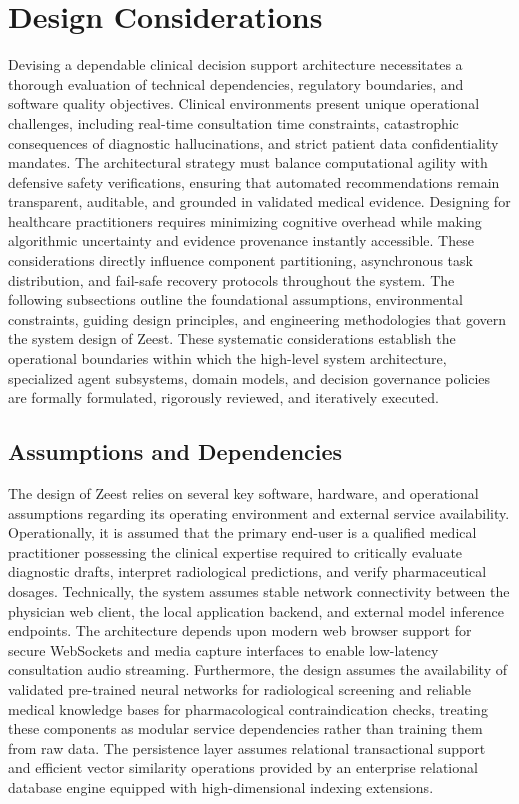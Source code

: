 \section{Design Considerations}
Devising a dependable clinical decision support architecture necessitates a thorough evaluation of technical dependencies, regulatory boundaries, and software quality objectives. Clinical environments present unique operational challenges, including real-time consultation time constraints, catastrophic consequences of diagnostic hallucinations, and strict patient data confidentiality mandates. The architectural strategy must balance computational agility with defensive safety verifications, ensuring that automated recommendations remain transparent, auditable, and grounded in validated medical evidence. Designing for healthcare practitioners requires minimizing cognitive overhead while making algorithmic uncertainty and evidence provenance instantly accessible. These considerations directly influence component partitioning, asynchronous task distribution, and fail-safe recovery protocols throughout the system. The following subsections outline the foundational assumptions, environmental constraints, guiding design principles, and engineering methodologies that govern the system design of Zeest. These systematic considerations establish the operational boundaries within which the high-level system architecture, specialized agent subsystems, domain models, and decision governance policies are formally formulated, rigorously reviewed, and iteratively executed.

\subsection{Assumptions and Dependencies}
The design of Zeest relies on several key software, hardware, and operational assumptions regarding its operating environment and external service availability. Operationally, it is assumed that the primary end-user is a qualified medical practitioner possessing the clinical expertise required to critically evaluate diagnostic drafts, interpret radiological predictions, and verify pharmaceutical dosages. Technically, the system assumes stable network connectivity between the physician web client, the local application backend, and external model inference endpoints. The architecture depends upon modern web browser support for secure WebSockets and media capture interfaces to enable low-latency consultation audio streaming. Furthermore, the design assumes the availability of validated pre-trained neural networks for radiological screening and reliable medical knowledge bases for pharmacological contraindication checks, treating these components as modular service dependencies rather than training them from raw data. The persistence layer assumes relational transactional support and efficient vector similarity operations provided by an enterprise relational database engine equipped with high-dimensional indexing extensions.

